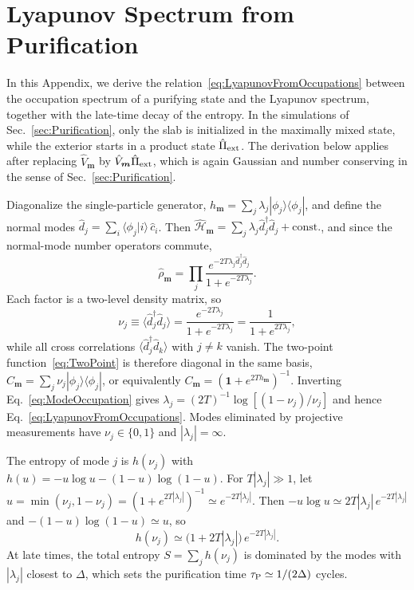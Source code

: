 \documentclass[aps,prb,twocolumn,superscriptaddress,longbibliography,floatfix]{revtex4-2}
\newcommand{\mc}[1]{\mathcal{#1}}
\newcommand{\bs}[1]{\boldsymbol{#1}}
\newcommand{\Id}{\mathbf{1}}
\newcommand{\rec}{\bs m}   %
\begin{document}
\section{Lyapunov Spectrum from Purification}
\label{app:Lyapunov}

In this Appendix, we derive the relation~\eqref{eq:LyapunovFromOccupations} between the occupation spectrum of a purifying state and the Lyapunov spectrum, together with the late-time decay of the entropy. In the simulations of Sec.~\ref{sec:Purification}, only the slab is initialized in the maximally mixed state, while the exterior starts in a product state $\hat\Pi_{\rm ext}$. The derivation below applies after replacing $\hat V_{\rec}$ by $\hat V_{\rec}\hat\Pi_{\rm ext}$, which is again Gaussian and number conserving in the sense of Sec.~\ref{sec:Purification}.

Diagonalize the single-particle generator, $h_{\rec}=\sum_j\lambda_j|\phi_j\rangle\langle\phi_j|$, and define the normal modes $\hat d_j=\sum_i\langle\phi_j|i\rangle\,\hat c_i$. Then $\hat{\mc H}_{\rec}=\sum_j\lambda_j\hat d^\dagger_j\hat d_j+\text{const.}$, and since the normal-mode number operators commute,
\begin{equation}
    \hat\rho_{\rec}=\prod_j\frac{e^{-2T\lambda_j\hat d^\dagger_j\hat d_j}}{1+e^{-2T\lambda_j}}.
    \label{eq:ThermalProduct}
\end{equation}
Each factor is a two-level density matrix, so
\begin{equation}
    \nu_j\equiv\langle\hat d^\dagger_j\hat d_j\rangle=\frac{e^{-2T\lambda_j}}{1+e^{-2T\lambda_j}}=\frac{1}{1+e^{2T\lambda_j}},
    \label{eq:ModeOccupation}
\end{equation}
while all cross correlations $\langle\hat d^\dagger_j\hat d_k\rangle$ with $j\neq k$ vanish. The two-point function~\eqref{eq:TwoPoint} is therefore diagonal in the same basis, $C_{\rec}=\sum_j\nu_j|\phi_j\rangle\langle\phi_j|$, or equivalently $C_{\rec}=(\Id+e^{2Th_{\rec}})^{-1}$. Inverting Eq.~\eqref{eq:ModeOccupation} gives $\lambda_j=(2T)^{-1}\log[(1-\nu_j)/\nu_j]$ and hence Eq.~\eqref{eq:LyapunovFromOccupations}. Modes eliminated by projective measurements have $\nu_j\in\{0,1\}$ and $|\lambda_j|=\infty$.

The entropy of mode $j$ is $h(\nu_j)$ with $h(u)=-u\log u-(1-u)\log(1-u)$. For $T|\lambda_j|\gg1$, let $u=\min(\nu_j,1-\nu_j)=(1+e^{2T|\lambda_j|})^{-1}\simeq e^{-2T|\lambda_j|}$. Then $-u\log u\simeq2T|\lambda_j|\,e^{-2T|\lambda_j|}$ and $-(1-u)\log(1-u)\simeq u$, so
\begin{equation}
    h(\nu_j)\simeq\big(1+2T|\lambda_j|\big)\,e^{-2T|\lambda_j|}.
    \label{eq:ModeEntropy}
\end{equation}
At late times, the total entropy $S=\sum_jh(\nu_j)$ is dominated by the modes with $|\lambda_j|$ closest to $\Delta$, which sets the purification time $\tau_{\rm P}\simeq1/(2\Delta)$ cycles.



\end{document}
